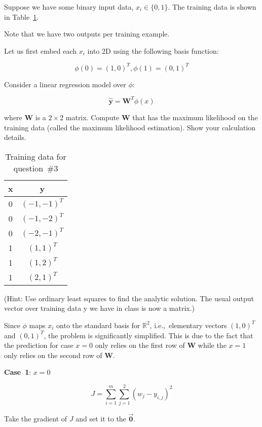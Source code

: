 \begin{problem}
  Suppose we have some binary input data, ${x_i \in \{0, 1\}}$. The training data is shown in Table~\ref{tab:P03:TrainingData}.


\noindent
Note that we have two outputs per training example.

Let us first embed each $x_i$ into 2D using the following basis function:

\[\phi(0) = (1, 0)^{T}, \phi(1) = (0, 1)^{T} \]

Consider a linear regression model over $\phi$:

\[\hat{\mathbf{y}} = \mathbf{W}^{T} \phi(x) \]

\noindent
where $\mathbf{W}$ is a $2\times2$ matrix. Compute $\mathbf{W}$ that has the maximum likelihood on the training data (called the maximum likelihood estimation). Show your calculation details.

\begin{table}[h]
  \centering
  \caption{Training data for question~\#3}\label{tab:P03:TrainingData}
  \begin{tabular}{c|c}
    x & y \\\hline
    0 & $(-1, -1)^{T}$\\
    0 & $(-1, -2)^{T}$\\
    0 & $(-2, -1)^{T}$\\
    1 & $(1, 1)^{T}$\\
    1 & $(1, 2)^{T}$\\
    1 & $(2, 1)^{T}$\\
  \end{tabular}
\end{table}

(Hint: \textnormal{Use ordinary least squares to find the analytic solution. The usual output vector over training data y we have in class is now a matrix.})
\end{problem}

Since $\phi$ maps $x_i$ onto the standard basis for $\mathbb{R}^2$, i.e.,~elementary vectors ${(1,0)}^{T}$ and ${(0,1)}^{T}$, the problem is significantly simplified.  This is due to the fact that the prediction for case $x=0$ only relies on the first row of $\mathbf{W}$ while the $x=1$ only relies on the second row of $\mathbf{W}$.

\noindent
\textbf{Case~1}: $x=0$

\[ J = \sum_{i=1}^{m} \sum_{j=1}^{2} \left(w_{j} - y_{i,j}\right)^2 \]

\noindent
Take the gradient of $J$ and set it to the $\vec{\mathbf{0}}$.

